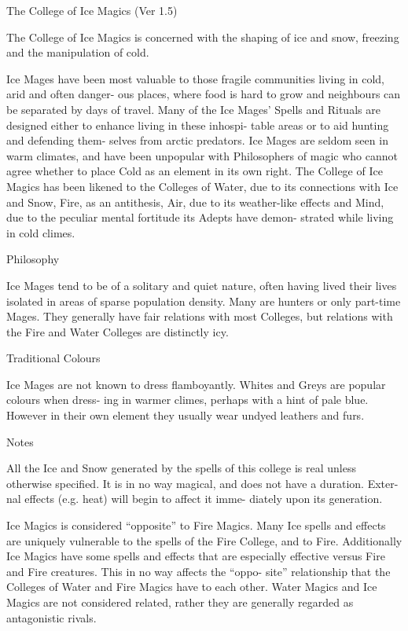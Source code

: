 \begin{Chapter}{The College of Ice Magics (Ver 1.5)}

The College of Ice Magics is concerned with the shaping of ice and
snow, freezing and the manipulation of cold.

Ice Mages have been most valuable to those fragile 
communities living in cold, arid and often danger-
ous  places,  where  food  is  hard  to  grow  and 
neighbours  can  be  separated  by  days  of  travel. 
Many  of  the  Ice  Mages’  Spells  and  Rituals  are 
designed either to enhance living in these inhospi-
table  areas  or  to  aid  hunting  and  defending  them-
selves from arctic predators. Ice Mages are seldom 
seen  in  warm  climates,  and  have  been  unpopular 
with  Philosophers  of  magic  who  cannot  agree 
whether  to  place  Cold  as  an  element  in  its  own 
right.  The  College  of  Ice  Magics has  been  likened 
to  the  Colleges  of  Water,  due  to  its  connections 
with  Ice and Snow,  Fire, as an antithesis, Air, due 
to  its  weather-like  effects  and  Mind,  due  to  the 
peculiar  mental  fortitude  its  Adepts  have  demon-
strated while living in cold climes. 

Philosophy 

Ice Mages tend to be of a solitary and quiet nature, 
often  having  lived  their  lives  isolated  in  areas  of 
sparse  population  density.  Many  are  hunters  or 
only  part-time  Mages.  They  generally  have  fair 
relations with most Colleges, but relations with the 
Fire and Water Colleges are distinctly icy. 

Traditional Colours 

Ice  Mages  are  not  known  to  dress  flamboyantly. 
Whites and Greys are popular colours when dress-
ing  in  warmer  climes,  perhaps  with  a  hint  of  pale 
blue.  However  in  their  own  element  they  usually 
wear undyed leathers and furs. 

Notes 

All the Ice and Snow generated by the spells of this 
college is real unless otherwise specified. It is in no 
way magical, and does not have a duration. Exter-
nal effects (e.g. heat) will begin to affect it imme-
diately upon its generation. 

Ice  Magics  is  considered  “opposite”  to  Fire 
Magics.  Many  Ice  spells  and  effects  are  uniquely 
vulnerable to the spells of the Fire College, and to 
Fire. Additionally Ice Magics have some spells and 
effects that are especially effective versus Fire and 
Fire  creatures.  This  in  no  way  affects  the  “oppo-
site”  relationship  that  the  Colleges  of  Water  and 
Fire Magics have to each other. Water Magics and 
Ice  Magics  are  not  considered  related,  rather  they 
are generally regarded as antagonistic rivals. 



\end{Chapter}
